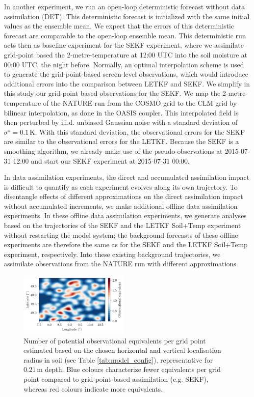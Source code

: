 \documentclass[HESSD, manuscript]{copernicus}
\begin{document}
In another experiment, we run an open-loop deterministic forecast without data assimilation (DET).
This deterministic forecast is initialized with the same initial values as the ensemble mean.
We expect that the errors of this deterministic forecast are comparable to the open-loop ensemble mean.
This deterministic run acts then as baseline experiment for the SEKF experiment, where we assimilate grid-point based the 2-metre-temperature at 12:00 UTC into the soil moisture at 00:00 UTC, the night before.
Normally, an optimal interpolation scheme is used to generate the grid-point-based screen-level observations, which would introduce additional errors into the comparison between LETKF and SEKF.
We simplify in this study our grid-point based observations for the SEKF.
We map the 2-metre-temperature of the NATURE run from the COSMO grid to the CLM grid by bilinear interpolation, as done in the OASIS coupler.
This interpolated field is then perturbed by i.i.d. unbiased Gaussian noise with a standard deviation of $\sigma^\text{o} = 0.1\,\text{K}$.
With this standard deviation, the observational errors for the SEKF are similar to the observational errors for the LETKF.
Because the SEKF is a smoothing algorithm, we already make use of the pseudo-observations at 2015-07-31 12:00 and start our SEKF experiment at 2015-07-31 00:00.

In data assimilation experiments, the direct and accumulated assimilation impact is difficult to quantify as each experiment evolves along its own trajectory.
To disentangle effects of different approximations on the direct assimilation impact without accumulated increments, we make additional offline data assimilation experiments.
In these offline data assimilation experiments, we generate analyses based on the trajectories of the SEKF and the LETKF Soil+Temp experiment without restarting the model system; the background forecasts of these offline experiments are therefore the same as for the SEKF and the LETKF Soil+Temp experiment, respectively.
Into these existing background trajectories, we assimilate observations from the NATURE run with different approximations.

\begin{figure}
	\includegraphics[width=0.48\textwidth]{figures/fig_01_obs_equivalent.png}
	\caption{
		Number of potential observational equivalents per grid point estimated based on the chosen horizontal and vertical localisation radius in soil (see Table \ref{tab:model_config}), representative for $0.21\,\text{m}$ depth.
		Blue colours characterize fewer equivalents per grid point compared to grid-point-based assimilation (e.g. SEKF), whereas red colours indicate more equivalents.
	}
	\label{fig:obs_equivalent}
\end{figure}
\end{document}
